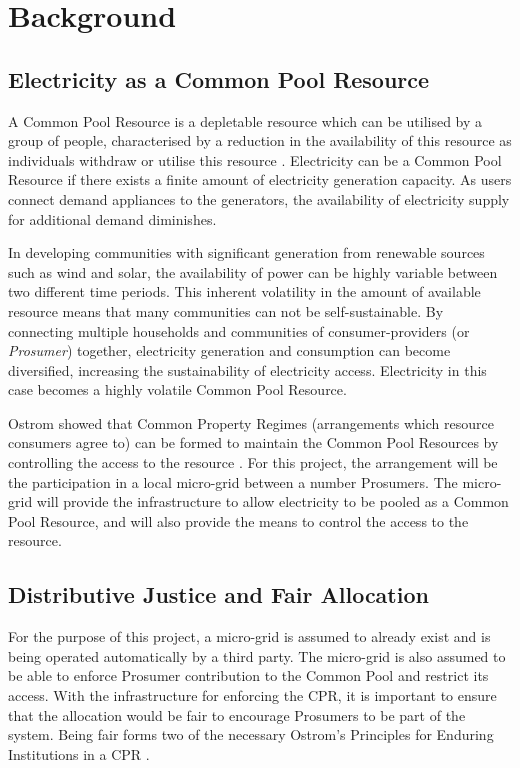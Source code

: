 \chapter{Background}
\label{Background}

\section*{Electricity as a Common Pool Resource}
A Common Pool Resource is a depletable resource which can be utilised by a group of people, characterised by a reduction in the availability of this resource as individuals withdraw or utilise this resource \cite{Ostrom:90}.  Electricity can be a Common Pool Resource if there exists a finite amount of electricity generation capacity. As users connect demand appliances to the generators, the availability of electricity supply for additional demand diminishes.

In developing communities with significant generation from renewable sources such as wind and solar, the availability of power can be highly variable between two different time periods. This inherent volatility in the amount of available resource means that many communities can not be self-sustainable. By connecting multiple households and communities of consumer-providers (or \textit{Prosumer}) together, electricity generation and consumption can become diversified, increasing the sustainability of electricity access. Electricity in this case becomes a highly volatile Common Pool Resource.

Ostrom showed that Common Property Regimes (arrangements which resource consumers agree to) can be formed to maintain the Common Pool Resources by controlling the access to the resource \cite{Ostrom:90}. For this project, the arrangement will be the participation in a local micro-grid between a number Prosumers. The micro-grid will provide the infrastructure to allow electricity to be pooled as a Common Pool Resource, and will also provide the means to control the access to the resource.

\section*{Distributive Justice and Fair Allocation}
For the purpose of this project, a micro-grid is assumed to already exist and is being operated automatically by a third party. The micro-grid is also assumed to be able to enforce Prosumer contribution to the Common Pool and restrict its access. With the infrastructure for enforcing the \ac{CPR}, it is important to ensure that the allocation would be fair to encourage Prosumers to be part of the system. Being fair forms two of the necessary Ostrom's Principles for Enduring Institutions in a CPR \cite{Ostrom:90}. \\


